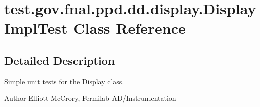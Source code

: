 \hypertarget{classtest_1_1gov_1_1fnal_1_1ppd_1_1dd_1_1display_1_1DisplayImplTest}{\section{test.\-gov.\-fnal.\-ppd.\-dd.\-display.\-Display\-Impl\-Test Class Reference}
\label{classtest_1_1gov_1_1fnal_1_1ppd_1_1dd_1_1display_1_1DisplayImplTest}
}


\subsection{Detailed Description}
Simple unit tests for the Display class.

\begin{DoxyAuthor}{Author}
Elliott Mc\-Crory, Fermilab A\-D/\-Instrumentation 
\end{DoxyAuthor}
